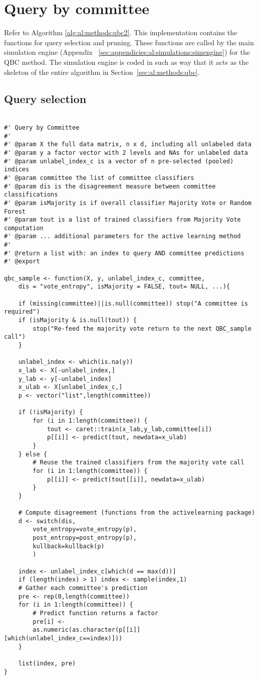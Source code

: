 \section{Query by committee}
\label{sec:appendicies:al:qbc}

Refer to Algorithm \ref{alg:al:methods:qbc2}. 
This implementation contains the functions for query selection and pruning. 
These functions are called by the main simulation engine (Appendix 
~\ref{sec:appendicies:al:simulations:simengine}) for the QBC method. 
The simulation engine is coded in such as way that it acts as the skeleton 
of the entire algorithm in Section~\ref{sec:al:methods:qbc}.

\subsection{Query selection}
{
\begin{lstlisting}

#' Query by Committee
#'
#' @param X the full data matrix, n x d, including all unlabeled data
#' @param y a factor vector with 2 levels and NAs for unlabeled data
#' @param unlabel_index_c is a vector of n pre-selected (pooled) indices
#' @param committee the list of committee classifiers
#' @param dis is the disagreement measure between committee classifications
#' @param isMajority is if overall classifier Majority Vote or Random Forest
#' @param tout is a list of trained classifiers from Majority Vote computation 
#' @param ... additional parameters for the active learning method
#'
#' @return a list with: an index to query AND committee predictions
#' @export

qbc_sample <- function(X, y, unlabel_index_c, committee,
	dis = "vote_entropy", isMajority = FALSE, tout= NULL, ...){
	
	if (missing(committee)||is.null(committee)) stop("A committee is required")
	if (isMajority & is.null(tout)) {
		stop("Re-feed the majority vote return to the next QBC_sample call")
	}
	
	unlabel_index <- which(is.na(y))
	x_lab <- X[-unlabel_index,]
	y_lab <- y[-unlabel_index]
	x_ulab <- X[unlabel_index_c,]
	p <- vector("list",length(committee))
	
	if (!isMajority) {
		for (i in 1:length(committee)) {
			tout <- caret::train(x_lab,y_lab,committee[i])
			p[[i]] <- predict(tout, newdata=x_ulab)
		}
	} else {
		# Reuse the trained classifiers from the majority vote call
		for (i in 1:length(committee)) {
			p[[i]] <- predict(tout[[i]], newdata=x_ulab)
		}
	}

	# Compute disagreement (functions from the activelearning package)
	d <- switch(dis,
		vote_entropy=vote_entropy(p),
		post_entropy=post_entropy(p),
		kullback=kullback(p)
		)
	
	index <- unlabel_index_c[which(d == max(d))]
	if (length(index) > 1) index <- sample(index,1)
	# Gather each committee's prediction
	pre <- rep(0,length(committee))
	for (i in 1:length(committee)) {
		# Predict function returns a factor
		pre[i] <- 
		as.numeric(as.character(p[[i]][which(unlabel_index_c==index)]))
	}
	
	list(index, pre)
}
\end{lstlisting}
}
